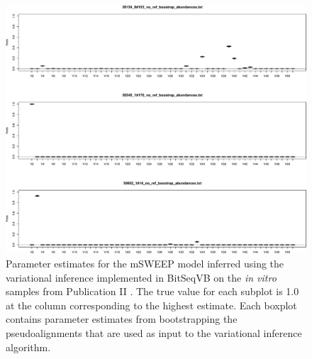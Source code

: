 \documentclass[officiallayout]{tktla}
\begin{document}
\begin{figure}[!t]
    \centering
    \includegraphics[width=\textwidth,keepaspectratio]{img/gibbs/msweep_reals.pdf}
    \caption{Parameter estimates for the mSWEEP model inferred using
      the variational inference implemented in BitSeqVB
      \citep{hensman2015fast} on the \textit{in vitro} samples from
      Publication II \citep{maklin_bacterial_2021}. The true value for
      each subplot is 1.0 at the column corresponding to the highest
      estimate. Each boxplot contains parameter estimates from
      bootstrapping the pseudoalignments that are used as input to the
      variational inference algorithm.}
    \label{fig:vb-estimates}
\end{figure}
\end{document}
